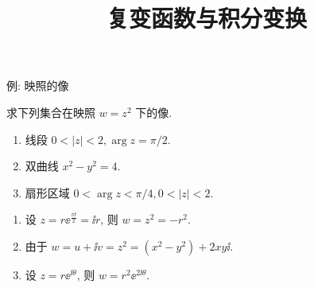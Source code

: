 \documentclass[aspectratio=169]{ctexbeamer}
\title{复变函数与积分变换}
\begin{document}
\begin{frame}{例: 映照的像}\small
	\pause
	\begin{example}[nearnext]
		求下列集合在映照 $w=z^2$ 下的像.
		\begin{enumerate}
			\item 线段 $0<|z|<2,\arg z=\pi/2$.
			\item 双曲线 $x^2-y^2=4$.
			\item 扇形区域 $0<\arg z<\pi/4,0<|z|<2$.
		\end{enumerate}
	\end{example}
	\pause
	\begin{solution}[nearprev]
		\begin{enumerate}
			\item 设 $z=r\ee^{\frac{\pi\ii}2}=\ii r$, 则 $w=z^2=-r^2$.
			\item 由于 $w=u+\ii v=z^2=(x^2-y^2)+2xy\ii$.
			\item 设 $z=r\ee^{\ii\theta}$, 则 $w=r^2\ee^{2\ii\theta}$.
		\end{enumerate}
	\end{solution}
\end{frame}
\end{document}
